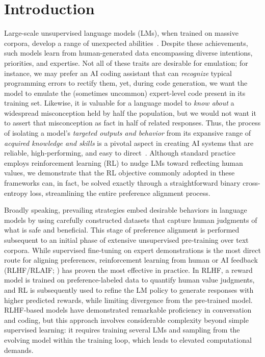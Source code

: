 \section{Introduction}
Large-scale unsupervised language models (LMs), when trained on massive corpora, develop a range of unexpected abilities~\citep{chowdhery2022palm, brown2020language, touvron2023llama,bubeck2023sparks}. Despite these achievements, such models learn from human-generated data encompassing diverse intentions, priorities, and expertise. Not all of these traits are desirable for emulation; for instance, we may prefer an AI coding assistant that can \textit{recognize} typical programming errors to rectify them, yet, during code generation, we want the model to emulate the (sometimes uncommon) expert-level code present in its training set. Likewise, it is valuable for a language model to \textit{know about} a widespread misconception held by half the population, but we would not want it to assert that misconception as fact in half of related responses. Thus, the process of isolating a model's \emph{targeted outputs and behavior} from its expansive range of \textit{acquired knowledge and skills} is a pivotal aspect in creating AI systems that are reliable, high-performing, and easy to direct~\citep{ouyang2022training}. Although standard practice employs reinforcement learning (RL) to nudge LMs toward reflecting human values, we demonstrate that the RL objective commonly adopted in these frameworks can, in fact, be solved exactly through a straightforward binary cross-entropy loss, streamlining the entire preference alignment process.

Broadly speaking, prevailing strategies embed desirable behaviors in language models by using carefully constructed datasets that capture human judgments of what is safe and beneficial. This stage of preference alignment is performed subsequent to an initial phase of extensive unsupervised pre-training over text corpora. While supervised fine-tuning on expert demonstrations is the most direct route for aligning preferences, reinforcement learning from human or AI feedback (RLHF/RLAIF; \citep{christiano2017deep,bai2022constitutional}) has proven the most effective in practice. In RLHF, a reward model is trained on preference-labeled data to quantify human value judgments, and RL is subsequently used to refine the LM policy to generate responses with higher predicted rewards, while limiting divergence from the pre-trained model. RLHF-based models have demonstrated remarkable proficiency in conversation and coding, but this approach involves considerable complexity beyond simple supervised learning: it requires training several LMs and sampling from the evolving model within the training loop, which leads to elevated computational demands.

